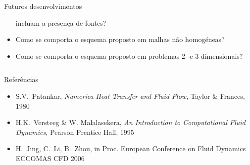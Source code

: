 \documentclass[final,t]{beamer}
\begin{document}
\begin{frame}{}
\begin{columns}[t]
\begin{column}{0.488\linewidth}
\begin{exampleblock}{Futuros desenvolvimentos}
\begin{itemize}
                    incluam a presença de fontes?
                \item Como se comporta o esquema proposto em malhas não
                    homogéneas?
                \item Como se comporta o esquema proposto em problemas 2- e
                    3-dimen\-sionais?
            \end{itemize}
            \strut
        \end{exampleblock}
    \end{column}
\end{columns}
\begin{columns}[t]
    \begin{column}{\linewidth}
        \small
        \begin{block}{Referências}
            \begin{itemize}
                \item S.V.~Patankar, \emph{Numerica Heat Transfer and Fluid
                    Flow,} Taylor \& Frances, 1980
                    \item H.K.~Versteeg \& W. Malalasekera, \emph{An
                    Introduction to Computational Fluid Dynamics,} Pearson
                    Prentice Hall, 1995
                \item H.~Jing, C.~Li, B.~Zhou, in Proc. European Conference on Fluid Dynamics
                    ECCOMAS CFD 2006
            \end{itemize}
        \end{block}
    \end{column}
\end{columns}
\end{frame}
\end{document}
